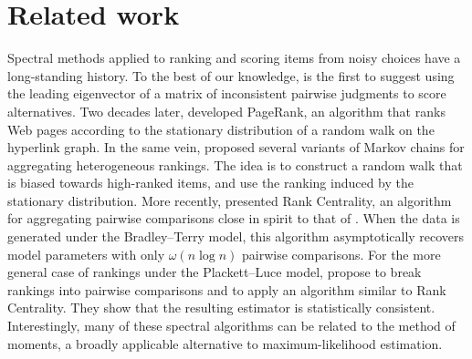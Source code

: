 \section{Related work}
\label{sec:relwork}

Spectral methods applied to ranking and scoring items from noisy choices have a long-standing history.
To the best of our knowledge, \citet{saaty1980analytic} is the first to suggest using the leading eigenvector of a matrix of inconsistent pairwise judgments to score alternatives.
Two decades later, \citet{page1998pagerank} developed PageRank, an algorithm that ranks Web pages according to the stationary distribution of a random walk on the hyperlink graph.
In the same vein, \citet{dwork2001rank} proposed several variants of Markov chains for aggregating heterogeneous rankings.
The idea is to construct a random walk that is biased towards high-ranked items, and use the ranking induced by the stationary distribution.
More recently, \citet{negahban2012iterative} presented Rank Centrality, an algorithm for aggregating pairwise comparisons close in spirit to that of \citep{dwork2001rank}.
When the data is generated under the Bradley--Terry model, this algorithm asymptotically recovers model parameters with only $\omega(n \log n)$ pairwise comparisons.
For the more general case of rankings under the Plackett--Luce model, \citet{azari2013generalized} propose to break rankings into pairwise comparisons and to apply an algorithm similar to Rank Centrality.
They show that the resulting estimator is statistically consistent.
Interestingly, many of these spectral algorithms can be related to the method of moments, a broadly applicable alternative to maximum-likelihood estimation.


